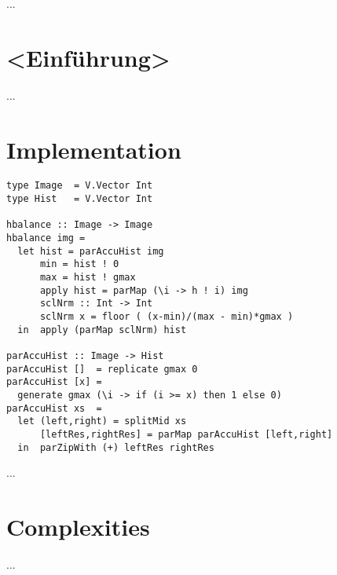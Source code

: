 

...

\section{<Einführung>}
  ...

\section{Implementation}

  \begin{lstlisting}
type Image  = V.Vector Int
type Hist   = V.Vector Int

hbalance :: Image -> Image
hbalance img =
  let hist = parAccuHist img
      min = hist ! 0
      max = hist ! gmax
      apply hist = parMap (\i -> h ! i) img
      sclNrm :: Int -> Int
      sclNrm x = floor ( (x-min)/(max - min)*gmax )
  in  apply (parMap sclNrm) hist

parAccuHist :: Image -> Hist
parAccuHist []  = replicate gmax 0
parAccuHist [x] =
  generate gmax (\i -> if (i >= x) then 1 else 0)
parAccuHist xs  =
  let (left,right) = splitMid xs
      [leftRes,rightRes] = parMap parAccuHist [left,right]
  in  parZipWith (+) leftRes rightRes
  \end{lstlisting}
  ...
    
\section{Complexities}
  ...
